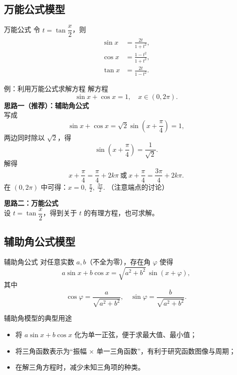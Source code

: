\documentclass[a4paper,11pt]{ctexart}
\begin{document}
\subsection{万能公式模型}

\begin{theorembox}{万能公式}
令 $t=\tan\dfrac{x}{2}$，则
\begin{align*}
\sin x &= \frac{2t}{1+t^2},\\
\cos x &= \frac{1-t^2}{1+t^2},\\
\tan x &= \frac{2t}{1-t^2}.
\end{align*}
\end{theorembox}

\begin{examplebox}{例：利用万能公式求解方程}
解方程
\[
  \sin x + \cos x = 1,\quad x\in(0,2\pi).
\]
\textbf{思路一（推荐）：辅助角公式}\\
写成
\[
\sin x + \cos x = \sqrt{2}\sin\left(x+\frac{\pi}{4}\right)=1,
\]
两边同时除以 $\sqrt{2}$，得
\[
\sin\left(x+\frac{\pi}{4}\right)=\frac{1}{\sqrt{2}}.
\]
解得
\[
x+\frac{\pi}{4}=\frac{\pi}{4}+2k\pi\ \text{或}\ x+\frac{\pi}{4}=\frac{3\pi}{4}+2k\pi.
\]
在 $(0,2\pi)$ 中可得：$x=0,\ \frac{\pi}{2},\ \frac{3\pi}{2}$. （注意端点的讨论）

\medskip
\textbf{思路二：万能公式}\\
设 $t=\tan\dfrac{x}{2}$，得到关于 $t$ 的有理方程，也可求解。
\end{examplebox}

\subsection{辅助角公式模型}

\begin{theorembox}{辅助角公式}
对任意实数 $a,b$（不全为零），存在角 $\varphi$ 使得
\[
a\sin x + b\cos x = \sqrt{a^2+b^2}\,\sin(x+\varphi),
\]
其中
\[
\cos\varphi = \frac{a}{\sqrt{a^2+b^2}},\quad
\sin\varphi = \frac{b}{\sqrt{a^2+b^2}}.
\]
\end{theorembox}

\begin{summarybox}{辅助角模型的典型用途}
\begin{itemize}
  \item 将 $a\sin x + b\cos x$ 化为单一正弦，便于求最大值、最小值；
  \item 将三角函数表示为“振幅 $\times$ 单一三角函数”，有利于研究函数图像与周期；
  \item 在解三角方程时，减少未知三角项的种类。
\end{itemize}
\end{summarybox}
\end{document}
